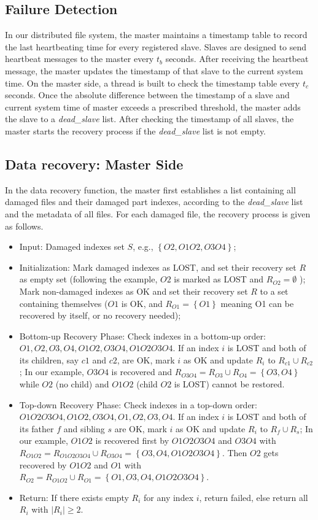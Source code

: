 \documentclass[conference]{IEEEtran}
\begin{document}
\subsection{Failure Detection}
In our distributed file system, the master maintains a timestamp table to record the last heartbeating time for every registered slave. Slaves are designed to send heartbeat messages to the master every $t_b$ seconds. After receiving the heartbeat message, the master updates the timestamp of that slave to the current system time. On the master side, a thread is built to check the timestamp table every $t_c$ seconds. Once the absolute difference between the timestamp of a slave and current system time of master exceeds a prescribed threshold, the master adds the slave to a \textit{dead\_slave}  list. After checking the timestamp of all slaves, the master starts the recovery process if the \textit{dead\_slave} list is not empty.
\subsection{Data recovery: Master Side}
In the data recovery function, the master first establishes a list containing all damaged files and their damaged part indexes, according to the \textit{dead\_slave} list and the metadata of all files. For each damaged file, the recovery process is given as follows.
\begin{itemize}
\item Input: Damaged indexes set $S$, e.g., $\left\{O2, O1O2, O3O4\right\}$;
\item Initialization: Mark damaged indexes as LOST, and set their recovery set $R$ as empty set (following the example, $O2$ is marked as LOST and $R_{O2} = \emptyset$ ); Mark non-damaged indexes as OK and set their recovery set $R$ to a set containing themselves ($O1$ is OK, and $R_{O1} = \left\{O1\right\}$ meaning O1 can be recovered by itself, or no recovery needed);
\item Bottom-up Recovery Phase: Check indexes in a bottom-up order: $O1, O2, O3, O4, O1O2, O3O4, O1O2O3O4$. If an index $i$ is LOST and both of its children, say $c1$ and $c2$, are OK, mark $i$ as OK and update $R_{i}$ to $R_{c1}\cup R_{c2}$; In our example, $O3O4$ is recovered and $R_{O3O4} = R_{O3}\cup R_{O4} = \left\{O3, O4\right\}$ while $O2$ (no child) and $O1O2$ (child $O2$ is LOST) cannot be restored.
\item Top-down Recovery Phase: Check indexes in a top-down order: $O1O2O3O4, O1O2, O3O4, O1, O2, O3, O4$. If an index $i$ is LOST and both of its father $f$ and sibling $s$ are OK, mark $i$ as OK and update $R_{i}$ to $R_{f}\cup R_{s}$; In our example, $O1O2$ is recovered first by $O1O2O3O4$ and $O3O4$ with $R_{O1O2} = R_{O1O2O3O4}\cup R_{O3O4} = \left\{O3, O4, O1O2O3O4\right\}$. Then $O2$ gets recovered by $O1O2$ and $O1$ with $R_{O2} = R_{O1O2}\cup R_{O1} = \left\{O1, O3, O4, O1O2O3O4\right\}$.
\item Return: If there exists empty $R_i$ for any index $i$, return failed, else return all $R_i$ with $|R_i|\ge2$.
\end{itemize}
\end{document}
